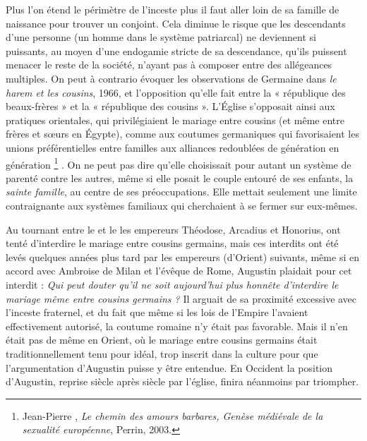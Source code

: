  Plus l'on étend le périmètre de l'inceste plus il faut aller loin de sa famille de naissance pour trouver un conjoint. Cela diminue le risque que les descendants d'une personne (un homme dans le système patriarcal) ne deviennent si puissants, au moyen d'une endogamie stricte de sa descendance, qu'ils puissent menacer le reste de la société, n'ayant pas à composer entre des allégeances multiples. On peut à contrario évoquer les observations de Germaine  dans \emph{le harem et les cousins}, 1966, et l'opposition qu'elle fait entre la « république des beaux-frères » et la « république des cousins ». L'Église s'opposait ainsi aux pratiques orientales, qui privilégiaient le mariage entre cousins (et même entre frères et sœurs en Égypte), comme aux coutumes germaniques qui favorisaient les unions préférentielles entre familles aux alliances redoublées de génération en génération%
\footnote{Jean-Pierre , \emph{Le chemin des amours barbares, Genèse médiévale de la sexualité européenne}, Perrin, 2003.}%
. On ne peut pas dire qu'elle choisissait pour autant un système de parenté contre les autres, même si elle posait le couple entouré de ses enfants, la {\emph{sainte famille}}, au centre de ses préoccupations. Elle mettait seulement une limite contraignante aux systèmes familiaux qui cherchaient à se fermer sur eux-mêmes.

 Au tournant entre le  et le  les empereurs Théodose, Arcadius et Honorius, ont tenté d'interdire le mariage entre cousins germains, mais ces interdits ont été levés quelques années plus tard par les empereurs (d'Orient) suivants, même si en accord avec Ambroise de Milan et l'évêque de Rome, Augustin plaidait pour cet interdit : \emph{Qui peut douter qu'il ne soit aujourd'hui plus honnête d'interdire le mariage même entre cousins germains ?} Il arguait de sa proximité excessive avec l'inceste fraternel, et du fait que même si les lois de l'Empire l'avaient effectivement autorisé, la coutume romaine n'y était pas favorable. Mais il n'en était pas de même en Orient, où le mariage entre cousins germains était traditionnellement tenu pour idéal, trop inscrit dans la culture pour que l'argumentation d'Augustin puisse y être entendue. En Occident la position d'Augustin, reprise siècle après siècle par l'église, finira néanmoins par triompher.

